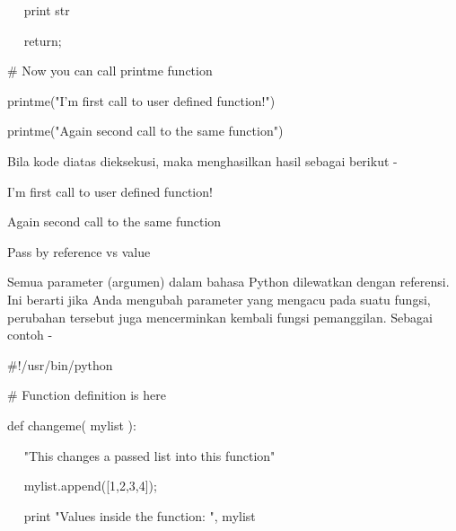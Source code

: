 \noindent 
~~  \hspace*{0.5in} print str \par
\noindent 
~~  \hspace*{0.5in} return; \par
\vspace{12pt}
\noindent 
 \hspace*{0.5in}  $  \#  $ Now you can call printme function \par
\noindent 
 \hspace*{0.5in} printme("I'm first call to user defined function!") \par
\noindent 
 \hspace*{0.5in} printme("Again second call to the same function") \par
\noindent 
Bila kode diatas dieksekusi, maka menghasilkan hasil sebagai berikut - \par
\noindent 
 \hspace*{0.5in} I'm first call to user defined function! \par
\noindent 
 \hspace*{0.5in} Again second call to the same function \par
\vspace{12pt}
\noindent 
Pass by reference vs value \par
\noindent 
Semua parameter (argumen) dalam bahasa Python dilewatkan dengan referensi. Ini berarti jika Anda mengubah parameter yang mengacu pada suatu fungsi, perubahan tersebut juga mencerminkan kembali fungsi pemanggilan. Sebagai contoh - \par
\noindent 
 \hspace*{0.5in}  $  \#  $!/usr/bin/python \par
\vspace{12pt}
\noindent 
 \hspace*{0.5in}  $  \#  $ Function definition is here \par
\noindent 
 \hspace*{0.5in} def changeme( mylist ): \par
\noindent 
 \hspace*{0.5in} ~~ "This changes a passed list into this function" \par
\noindent 
~~  \hspace*{0.5in}  \hspace*{0.5in} mylist.append([1,2,3,4]); \par
\noindent 
~~  \hspace*{0.5in} print "Values inside the function: ", mylist \par
